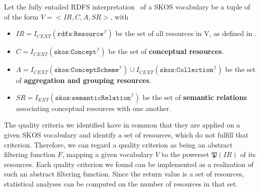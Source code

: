 \begin{definition} Let the fully entailed RDFS interpretation~\cite{RDFSEM2012} of a SKOS vocabulary be a tuple of of the form $V = <IR, C, A, SR>$, with
    

\begin{itemize}
	\item \(IR = I_{CEXT}(\texttt{rdfs:Resource}^\mathcal{I})\) be the set of all resources in V, as defined in \cite{RDFSEM2012}.

	\item \(C = I_{CEXT}(\texttt{skos:Concept}^\mathcal{I})\) be the set of \textbf{conceptual resources}.

  \item \(A = I_{CEXT}(\texttt{skos:ConceptScheme}^\mathcal{I}) \cup I_{CEXT}(\texttt{skos:Collection}^\mathcal{I})\) be the set of \textbf{aggregation and grouping resources}.


	\item \(SR = I_{EXT}(\texttt{skos:semanticRelation}^\mathcal{I})\) be the set of \textbf{semantic relations} associating conceptual resources with one another.

\end{itemize}

\end{definition}


The quality criteria we identified have in common that they are applied on a given SKOS vocabulary and identify a set of resources, which do not fulfill that criterion. Therefore, we can regard a quality criterion as being an abstract filtering function $F$, mapping a given vocabulary $V$ to the powerset $\mathfrak{P}(IR)$ of its resources. Each quality criterion we found can be implemented as a realization of such an abstract filtering function. Since the return value is a set of resources, statistical analyses can be computed on the number of resources in that set.

